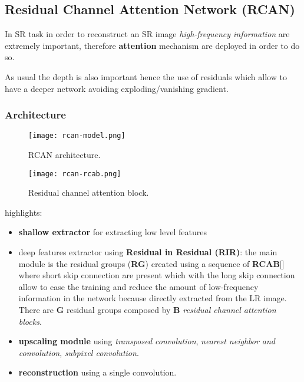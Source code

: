 \subsection{Residual Channel Attention Network (RCAN\cite{RCAN})}

In SR task in order to reconstruct an SR image \textit{high-frequency information} are extremely important, therefore \textbf{attention} mechanism are deployed in order to do so.

As usual the depth is also important hence the use of residuals which allow to have a deeper network avoiding exploding/vanishing gradient.

\subsubsection{Architecture}
\begin{figure}
    \centering
    \texttt{[image: rcan-model.png]}
    \caption{RCAN architecture.}\label{rcan:model}
\end{figure}
\begin{figure}
    \centering
    \texttt{[image: rcan-rcab.png]}
    \caption{Residual channel attention block.}\label{rcan:rcab}
\end{figure}


 highlights:
\begin{itemize}
    \item \textbf{shallow extractor} for extracting low level features
    \item deep features extractor using \textbf{Residual in Residual (RIR)}: the main module is the residual groups (\textbf{RG}) created using a sequence of \textbf{RCAB}[] where short skip connection are present which with the long skip connection allow to ease the training and reduce the amount of low-frequency information in the network because directly extracted from the LR image.
    There are \textbf{G} residual groups composed by \textbf{B} \textit{residual channel attention blocks}.
    \item \textbf{upscaling module} using \textit{transposed convolution}, \textit{nearest neighbor and convolution}, \textit{subpixel convolution}.
    \item \textbf{reconstruction} using a single convolution.
\end{itemize}

